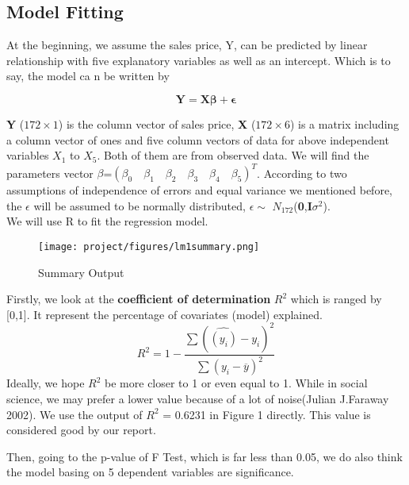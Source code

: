\documentclass[a4paper]{article}
\begin{document}
\subsection{Model Fitting}
At the beginning,  we assume the sales price, Y, can be predicted by linear relationship with five explanatory variables as well as an intercept. Which is to                                                                                                                                                                               say, the model ca                           n be written by 
\begin{center}
	\begin{equation*}
	\mathbf{Y}=\mathbf{X}\boldsymbol{\beta}+\boldsymbol{\epsilon}
	\end{equation*}
\end{center}
\textbf{Y} ($172 \times 1$) is the column vector of sales price, \textbf{X} ($172 \times 6$) is a matrix including a column vector of ones and five column vectors of data for above independent variables $X_1$ to $X_5$. Both of them are from observed data. We will find the parameters vector \textbf{$\beta$}=$(\beta_0 \quad \beta_1 \quad \beta_2 \quad \beta_3 \quad \beta_4 \quad \beta_5)^T$.
According to two assumptions of independence of errors and equal variance we mentioned before, the  $\epsilon$ will be assumed to be normally distributed, $\epsilon \sim$ $N_{172}$(\textbf{0},\textbf{I$\sigma^2$}).\\

\noindent
We will use R to fit the regression model.
\begin{figure}[!htb]
    \centering
    \texttt{[image: project/figures/lm1summary.png]}
    \caption{Summary Output}
    \label{3}
\end{figure}

\noindent
Firstly, we look at the \textbf{coefficient of determination} $R^2$ which is ranged by [0,1]. It represent the percentage of covariates (model) explained.
\begin{equation*}
    R^2=1-\frac{\sum(\hat{(y_i)}-y_i)^2}{\sum(y_i-\overline{y})^2}
\end{equation*}
Ideally, we hope $R^2$ be more closer to 1 or even equal to 1. While in social science, we may prefer a lower value because of a lot of noise(Julian J.Faraway 2002). We use the output of $R^2$ = 0.6231 in Figure 1 directly. This value is considered good by our report. 

\noindent
Then, going to the p-value of F Test, which is far less than 0.05, we do also think the model basing on 5 dependent variables are significance.
\end{document}
